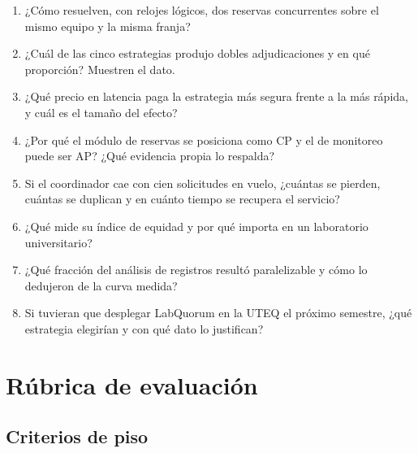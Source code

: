 \documentclass[11pt,a4paper]{article}
\begin{document}
\begin{enumerate}[leftmargin=*,itemsep=4pt]
	\item ¿Cómo resuelven, con relojes lógicos, dos reservas concurrentes sobre el mismo equipo y la misma franja?
	\item ¿Cuál de las cinco estrategias produjo dobles adjudicaciones y en qué proporción? Muestren el dato.
	\item ¿Qué precio en latencia paga la estrategia más segura frente a la más rápida, y cuál es el tamaño del efecto?
	\item ¿Por qué el módulo de reservas se posiciona como CP y el de monitoreo puede ser AP? ¿Qué evidencia propia lo respalda?
	\item Si el coordinador cae con cien solicitudes en vuelo, ¿cuántas se pierden, cuántas se duplican y en cuánto tiempo se recupera el servicio?
	\item ¿Qué mide su índice de equidad y por qué importa en un laboratorio universitario?
	\item ¿Qué fracción del análisis de registros resultó paralelizable y cómo lo dedujeron de la curva medida?
	\item Si tuvieran que desplegar LabQuorum en la UTEQ el próximo semestre, ¿qué estrategia elegirían y con qué dato lo justifican?
\end{enumerate}

\section{Rúbrica de evaluación}

\subsection{Criterios de piso}
\end{document}
